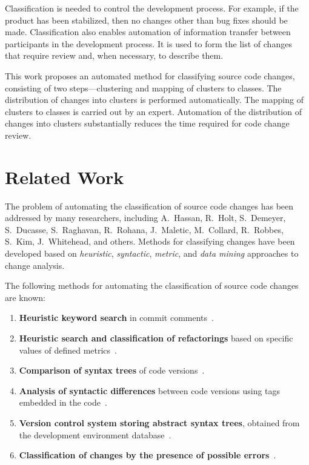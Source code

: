 \documentclass[11pt,a4paper]{article}
\begin{document}
Classification is needed to control the development process. For example, if the product has been stabilized, then no changes other than bug fixes should be made. Classification also enables automation of information transfer between participants in the development process. It is used to form the list of changes that require review and, when necessary, to describe them.

This work proposes an automated method for classifying source code changes, consisting of two steps---clustering and mapping of clusters to classes. The distribution of changes into clusters is performed automatically. The mapping of clusters to classes is carried out by an expert. Automation of the distribution of changes into clusters substantially reduces the time required for code change review.

\section{Related Work}
\label{sec:related}

The problem of automating the classification of source code changes has been addressed by many researchers, including A.~Hassan, R.~Holt, S.~Demeyer, S.~Ducasse, S.~Raghavan, R.~Rohana, J.~Maletic, M.~Collard, R.~Robbes, S.~Kim, J.~Whitehead, and others. Methods for classifying changes have been developed based on \textit{heuristic}, \textit{syntactic}, \textit{metric}, and \textit{data mining} approaches to change analysis.

The following methods for automating the classification of source code changes are known:

\begin{enumerate}
    \item \textbf{Heuristic keyword search} in commit comments~\cite{Hassan2004}.
    \item \textbf{Heuristic search and classification of refactorings} based on specific values of defined metrics~\cite{Demeyer2000}.
    \item \textbf{Comparison of syntax trees} of code versions~\cite{Raghavan2004}.
    \item \textbf{Analysis of syntactic differences} between code versions using tags embedded in the code~\cite{Maletic2004}.
    \item \textbf{Version control system storing abstract syntax trees}, obtained from the development environment database~\cite{Robbes2007}.
    \item \textbf{Classification of changes by the presence of possible errors}~\cite{Kim2006}.
\end{enumerate}
\end{document}

